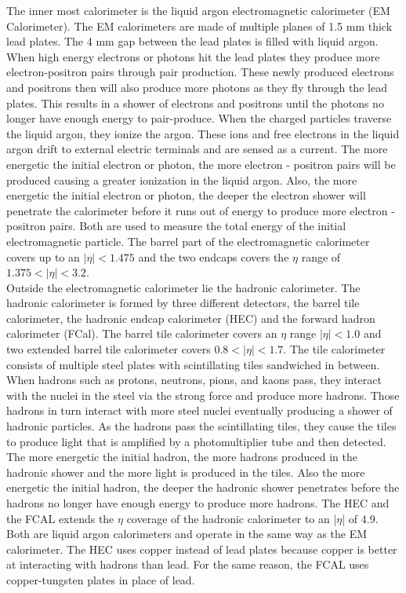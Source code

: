 \indent The inner most calorimeter is the liquid argon electromagnetic calorimeter (EM Calorimeter). The EM calorimeters are made of multiple planes of 1.5 mm thick lead plates. The 4 mm gap between the lead plates is filled with liquid argon. When high energy electrons or photons hit the lead plates they produce more electron-positron pairs through pair production. These newly produced electrons and positrons then will also produce more photons as they fly through the lead plates. This results in a shower of electrons and positrons until the photons no longer have enough energy to pair-produce. When the charged particles traverse the liquid argon, they ionize the argon. These ions and free electrons in the liquid argon drift to external electric terminals and are sensed as a current. The more energetic the initial electron or photon, the more electron - positron pairs will be produced causing a greater ionization in the liquid argon. Also, the more energetic the initial electron or photon, the deeper the electron shower will penetrate the calorimeter before it runs out of energy to produce more electron - positron pairs. Both are used to measure the total energy of the initial electromagnetic particle. The barrel part of the electromagnetic calorimeter covers up to an $|\eta| < 1.475$ and the two endcaps covers the $\eta$ range of $1.375 < |\eta| < 3.2$. ~\\
\indent Outside the electromagnetic calorimeter lie the hadronic calorimeter. The hadronic calorimeter is formed by three different detectors, the barrel tile calorimeter, the hadronic endcap calorimeter (HEC) and the forward hadron calorimeter (FCal). The barrel tile calorimeter covers an $\eta$ range $|\eta| < 1.0$ and two extended barrel tile calorimeter covers $0.8 < |\eta| < 1.7$. The tile calorimeter consists of multiple steel plates with scintillating tiles sandwiched in between. When hadrons such as protons, neutrons, pions, and kaons pass, they interact with the nuclei in the steel via the strong force and produce more hadrons. Those hadrons in turn interact with more steel nuclei eventually producing a shower of hadronic particles. As the hadrons pass the scintillating tiles, they cause the tiles to produce light that is amplified by a photomultiplier tube and then detected. The more energetic the initial hadron, the more hadrons produced in the hadronic shower and the more light is produced in the tiles. Also the more energetic the initial hadron, the deeper the hadronic shower penetrates before the hadrons no longer have enough energy to produce more hadrons. The HEC and the FCAL extends the $\eta$ coverage of the hadronic calorimeter to an |$\eta$| of 4.9. Both are liquid argon calorimeters and operate in the same way as the EM calorimeter. The HEC uses copper instead of lead plates because copper is better at interacting with hadrons than lead. For the same reason, the FCAL uses copper-tungsten plates in place of lead.~\\
